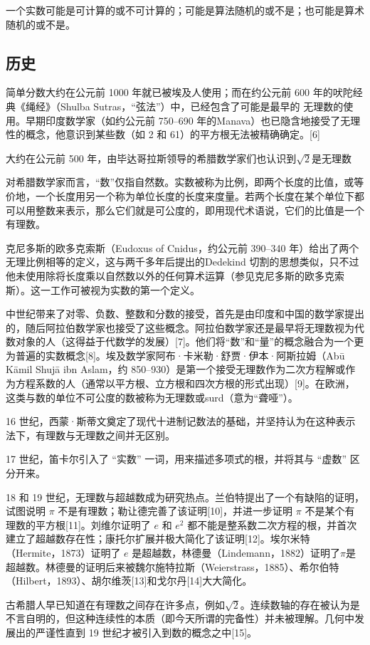 一个实数可能是可计算的或不可计算的；可能是算法随机的或不是；也可能是算术随机的或不是。
\subsection{历史}
简单分数大约在公元前 1000 年就已被埃及人使用；而在约公元前 600 年的吠陀经典《绳经》（Shulba Sutras，“弦法”）中，已经包含了可能是最早的 无理数的使用。早期印度数学家（如约公元前 750–690 年的Manava）也已隐含地接受了无理性的概念，他意识到某些数（如 2 和 61）的平方根无法被精确确定。[6]

大约在公元前 500 年，由毕达哥拉斯领导的希腊数学家们也认识到$\sqrt{2}$是无理数

对希腊数学家而言，“数”仅指自然数。实数被称为比例，即两个长度的比值，或等价地，一个长度用另一个称为单位长度的长度来度量。若两个长度在某个单位下都可以用整数来表示，那么它们就是可公度的，即用现代术语说，它们的比值是一个有理数。

克尼多斯的欧多克索斯（Eudoxus of Cnidus，约公元前 390–340 年）给出了两个无理比例相等的定义，这与两千多年后提出的Dedekind 切割的思想类似，只不过他未使用除将长度乘以自然数以外的任何算术运算（参见克尼多斯的欧多克索斯）。这一工作可被视为实数的第一个定义。

中世纪带来了对零、负数、整数和分数的接受，首先是由印度和中国的数学家提出的，随后阿拉伯数学家也接受了这些概念。阿拉伯数学家还是最早将无理数视为代数对象的人（这得益于代数学的发展）[7]。他们将“数”和“量”的概念融合为一个更为普遍的实数概念[8]。埃及数学家阿布·卡米勒·舒贾·伊本·阿斯拉姆（Abū Kāmil Shujā ibn Aslam，约 850–930）是第一个接受无理数作为二次方程解或作为方程系数的人（通常以平方根、立方根和四次方根的形式出现）[9]。在欧洲，这类与数的单位不可公度的数被称为无理数或surd（意为“聋哑”）。

16 世纪，西蒙·斯蒂文奠定了现代十进制记数法的基础，并坚持认为在这种表示法下，有理数与无理数之间并无区别。

17 世纪，笛卡尔引入了 “实数” 一词，用来描述多项式的根，并将其与 “虚数” 区分开来。

18 和 19 世纪，无理数与超越数成为研究热点。兰伯特提出了一个有缺陷的证明，试图说明 $\pi$ 不是有理数；勒让德完善了该证明[10]，并进一步证明 $\pi$ 不是某个有理数的平方根[11]。刘维尔证明了 $e$ 和 $e^2$ 都不能是整系数二次方程的根，并首次建立了超越数存在性；康托尔扩展并极大简化了该证明[12]。埃尔米特（Hermite，1873）证明了 $e$ 是超越数，林德曼（Lindemann，1882）证明了$\pi$是超越数。林德曼的证明后来被魏尔施特拉斯（Weierstrass，1885）、希尔伯特（Hilbert，1893）、胡尔维茨[13]和戈尔丹[14]大大简化。

古希腊人早已知道在有理数之间存在许多点，例如$\sqrt{2}$。连续数轴的存在被认为是不言自明的，但这种连续性的本质（即今天所谓的完备性）并未被理解。几何中发展出的严谨性直到 19 世纪才被引入到数的概念之中[15]。
